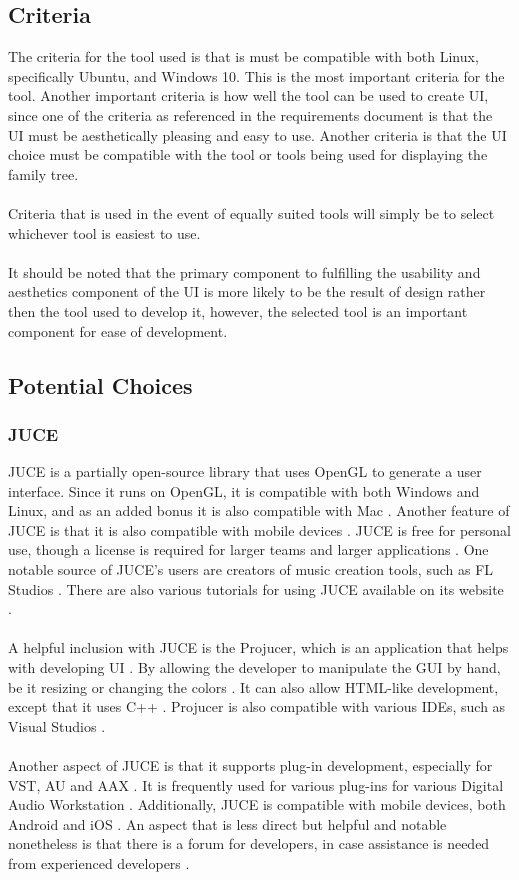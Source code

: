 \documentclass[onecolumn, draftclsnofoot,10pt, compsoc]{IEEEtran}
\begin{document}
\subsection{Criteria}
The criteria for the tool used is that is must be compatible with both Linux, specifically Ubuntu, and Windows 10. This is the most important criteria for the tool. Another important criteria is how well the tool can be used to create UI, since one of the criteria as referenced in the requirements document is that the UI must be aesthetically pleasing and easy to use. Another criteria is that the UI choice must be compatible with the tool or tools being used for displaying the family tree.
\\
\\
Criteria that is used in the event of equally suited tools will simply be to select whichever tool is easiest to use. 
\\
\\
It should be noted that the primary component to fulfilling the usability and aesthetics component of the UI is more likely to be the result of design rather then the tool used to develop it, however, the selected tool is an important component for ease of development.
\subsection{Potential Choices}
\subsubsection{JUCE}
JUCE is a partially open-source library that uses OpenGL to generate a user interface. Since it runs on OpenGL, it is compatible with both Windows and Linux, and as an added bonus it is also compatible with Mac  \cite{J1}. Another feature of JUCE is that it is also compatible with mobile devices \cite{J1}. JUCE is free for personal use, though a license is required for larger teams and larger applications \cite{J1}. One notable source of JUCE's users are creators of music creation tools, such as FL Studios \cite{J1}. There are also various tutorials for using JUCE available on its website \cite{J1}.
\\
\\
A helpful inclusion with JUCE is the Projucer, which is an application that helps with developing UI \cite{J1}. By allowing the developer to manipulate the GUI by hand, be it resizing or changing the colors \cite{J1}. It can also allow HTML-like development, except that it uses C++ \cite{J1}. Projucer is also compatible with various IDEs, such as Visual Studios \cite{J1}.
\\
\\
Another aspect of JUCE is that it supports plug-in development, especially for VST, AU and AAX \cite{J1}. It is frequently used for various plug-ins for various Digital Audio Workstation \cite{J1}. Additionally, JUCE is compatible with mobile devices, both Android and iOS \cite{J1}. An aspect that is less direct but helpful and notable nonetheless is that there is a forum for developers, in case assistance is needed from experienced developers \cite{J1}.
\end{document}
